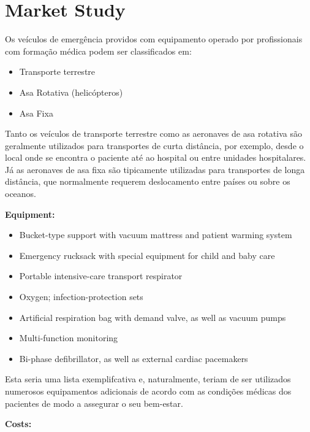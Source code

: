 \section{Market Study}
Os veículos de emergência providos com equipamento operado por profissionais com formação médica podem ser classificados em:
\begin{itemize}
    \item Transporte terrestre
    \item Asa Rotativa (helicópteros)
    \item Asa Fixa
\end{itemize}

Tanto os veículos de transporte terrestre como as aeronaves de asa rotativa são geralmente utilizados para transportes de curta distância, por exemplo, desde o local onde se encontra o paciente até ao hospital ou entre unidades hospitalares. Já as aeronaves de asa fixa são tipicamente utilizadas para transportes de longa distância, que normalmente requerem deslocamento entre países ou sobre os oceanos.

\textbf{Equipment:}
\begin{itemize}
    \item Bucket-type support with vacuum mattress and patient warming system
    \item Emergency rucksack with special equipment for child and baby care
    \item Portable intensive-care transport respirator \item Oxygen; infection-protection sets
    \item Artificial respiration bag with demand valve, as well as vacuum pumps
    \item Multi-function monitoring
    \item Bi-phase defibrillator, as well as external cardiac pacemakers
\end{itemize}
\par Esta seria uma lista exemplifcativa e, naturalmente, teriam de ser utilizados numerosos equipamentos adicionais de acordo com as condições médicas dos pacientes de modo a assegurar o seu bem-estar.

\textbf{Costs:}

